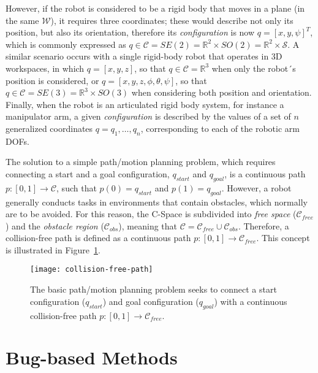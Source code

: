 However, if the robot is considered to be a rigid body that moves in a plane
(\ie in the same $\mathcal{W}$), it requires three coordinates; these would
describe not only its position, but also its orientation, therefore its
\textit{configuration} is now $q=[x,y,\psi]^T$, which is commonly expressed as
$q \in \mathcal{C} = SE(2) = \mathbb{R}^2 \times SO(2) = \mathbb{R}^2 \times
\mathcal{S}$. A similar scenario occurs with a single rigid-body robot that
operates in \ac{3D} workspaces, in which $q = [x,y,z]$, so that $q \in
\mathcal{C}=\mathbb{R}^3$ when only the robot´s position is considered, or $q =
[x,y,z, \phi, \theta, \psi]$, so that $q \in \mathcal{C} = SE(3) = \mathbb{R}^3
\times SO(3)$ when considering both position and orientation. Finally, when the
robot is an articulated rigid body system, for instance a manipulator arm, a
given \textit{configuration} is described by the values of a set of $n$
generalized coordinates $q = q_1, \ldots , q_n$, corresponding to each of the
robotic arm \acp{DOF}.

The solution to a simple path/motion planning problem, which requires connecting
a start and a goal configuration, $q_{start}$ and $q_{goal}$, is a continuous
path $p:[0,1] \rightarrow \mathcal{C}$, such that $p(0)=q_{start}$ and
$p(1)=q_{goal}$. However, a robot generally conducts tasks in environments that
contain obstacles, which normally are to be avoided. For this reason, the
\ac{C-Space} is subdivided into \textit{free space} ($\mathcal{C}_{free}$) and
the \textit{obstacle region} ($\mathcal{C}_{obs}$), meaning that $\mathcal{C} =
\mathcal{C}_{free} \cup \mathcal{C}_{obs}$. Therefore, a collision-free path is
defined as a continuous path $p:[0,1] \rightarrow \mathcal{C}_{free}$. This
concept is illustrated in Figure~\ref{fig:collision-free-path}.

\begin{figure}[htbp]
	\centering
	\texttt{[image: collision-free-path]}
\caption[The basic path/motion planning problem and the \ac{C-Space} concept.]
{The basic path/motion planning problem seeks to connect a start configuration
($q_{start}$) and goal configuration ($q_{goal}$) with a continuous
collision-free path $p:[0,1] \rightarrow \mathcal{C}_{free}$.}
\label{fig:collision-free-path}
\end{figure}

\section{Bug-based Methods}

